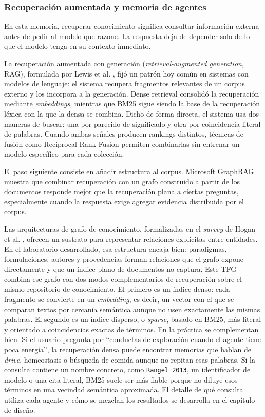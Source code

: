 \subsubsection{Recuperación aumentada y memoria de agentes}

En esta memoria, recuperar conocimiento significa consultar información externa
antes de pedir al modelo que razone. La respuesta deja de depender solo de lo
que el modelo tenga en su contexto inmediato.

La recuperación aumentada con generación (\textit{retrieval-augmented
generation}, RAG), formulada por
Lewis et al. \cite{lewis2020rag}, fijó un patrón hoy común en sistemas
con modelos de lenguaje: el sistema recupera fragmentos relevantes de un corpus
externo y los incorpora a la generación. Dense
retrieval consolidó la recuperación mediante \textit{embeddings}, mientras
que BM25 \cite{robertson2009bm25} sigue siendo la base de la recuperación
léxica con la que la densa se combina. Dicho de forma directa, el sistema usa
dos maneras de buscar: una por parecido de significado y otra por coincidencia
literal de palabras. Cuando ambas señales producen
rankings distintos, técnicas de fusión como Reciprocal Rank
Fusion \cite{cormack2009rrf} permiten combinarlas sin
entrenar un modelo específico para cada colección.

El paso siguiente consiste en añadir estructura al corpus. Microsoft
GraphRAG \cite{edge2024graphrag} muestra que combinar recuperación con un
grafo construido a partir de los documentos responde mejor que la recuperación
plana a ciertas preguntas, especialmente cuando la respuesta exige
agregar evidencia distribuida por el corpus.

Las arquitecturas de grafo de conocimiento, formalizadas en el
\textit{survey} de Hogan et al. \cite{hogan2021knowledgegraphs}, ofrecen
un sustrato para representar relaciones explícitas entre entidades.
En el laboratorio desarrollado, esa estructura encaja bien: paradigmas,
formulaciones, autores y procedencias forman relaciones que el grafo expone
directamente y que un índice plano de documentos no captura. Este TFG
combina ese grafo con dos modos complementarios de recuperación sobre el
mismo repositorio de conocimiento. El primero es un índice denso: cada
fragmento se convierte en un \textit{embedding}, es decir, un vector con el que
se comparan textos por cercanía semántica aunque no usen exactamente
las mismas palabras. El segundo es un índice disperso, o \textit{sparse},
basado en BM25, más literal y orientado a coincidencias exactas de términos.
En la práctica se complementan bien. Si el usuario pregunta por ``conductas de
exploración cuando el agente tiene poca energía'', la recuperación densa puede
encontrar memorias que hablan de \textit{drive}, homeostasis o búsqueda de
comida aunque no repitan esas palabras. Si la consulta contiene un nombre
concreto, como \texttt{Rangel 2013}, un identificador de modelo o una cita
literal, BM25 suele ser más fiable porque no diluye esos términos en una
vecindad semántica aproximada. El detalle de qué consulta utiliza cada
agente y cómo se mezclan los resultados se desarrolla en el capítulo de
diseño.

